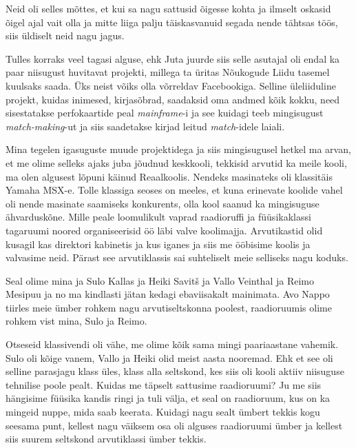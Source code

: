 
Neid oli selles mõttes, et kui sa nagu sattusid õigesse kohta ja ilmselt 
oskasid õigel ajal vait olla ja mitte liiga palju täiskasvanuid  segada nende 
tähtsas töös,  siis üldiselt neid nagu jagus. 

Tulles korraks veel tagasi  alguse, ehk Juta juurde 
siis selle asutajal oli endal ka paar niisugust  huvitavat projekti, millega ta 
üritas Nõukogude Liidu tasemel kuulsaks saada. Üks neist võiks olla  võrreldav 
Facebookiga. Selline üleliiduline projekt, kuidas inimesed, kirjasõbrad, 
saadaksid oma andmed kõik kokku, need sisestatakse perfokaartide peal 
\emph{mainframe}-i ja see kuidagi teeb mingisugust \emph{match-making}-ut ja 
siis saadetakse kirjad leitud \emph{match}-idele laiali. 

Mina tegelen igasuguste muude projektidega ja siis mingisugusel hetkel ma 
arvan, et me olime selleks ajaks juba jõudnud keskkooli, tekkisid arvutid ka 
meile kooli, ma olen  algusest lõpuni käinud Reaalkoolis.  Nendeks masinateks 
oli klassitäis Yamaha MSX-e. Tolle klassiga seoses on 
meeles, et kuna erinevate koolide vahel oli nende masinate saamiseks 
konkurents,  olla kool saanud ka mingisuguse ähvarduskõne. Mille peale 
loomulikult vaprad raadioruffi ja füüsikaklassi tagaruumi noored organiseerisid 
öö läbi valve koolimajja. Arvutikastid olid kusagil kas direktori kabinetis ja 
kus iganes ja siis me ööbisime koolis ja valvasime neid. Pärast see 
arvutiklassis sai suhteliselt meie selliseks nagu koduks.


Seal olime mina ja Sulo Kallas ja Heiki 
Savitš ja Vallo Veinthal  
ja Reimo Mesipuu ja no ma kindlasti jätan kedagi 
ebaviisakalt mainimata.  Avo Nappo tiirles meie ümber 
rohkem nagu arvutiseltskonna poolest, raadioruumis olime rohkem vist mina, Sulo 
ja Reimo.


Otseseid klassivendi oli  vähe, me olime kõik sama mingi paariaastane vahemik. 
Sulo oli kõige vanem, Vallo ja Heiki  olid meist aasta nooremad. Ehk et see oli 
selline parasjagu  klass üles, klass alla seltskond, kes siis oli kooli aktiiv 
niisuguse tehnilise poole pealt. Kuidas me täpselt sattusime raadioruumi? Ju me 
siis hängisime füüsika kandis ringi ja  tuli välja, et seal on raadioruum, kus 
on ka mingeid nuppe, mida saab keerata. Kuidagi nagu sealt ümbert tekkis kogu 
seesama punt, kellest nagu väiksem osa oli  alguses raadioruumi ümber ja 
kellest siis suurem seltskond arvutiklassi ümber tekkis. 


